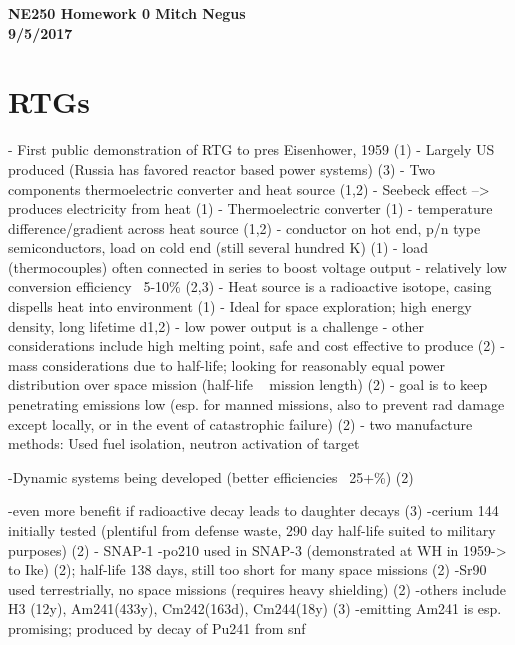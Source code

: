 \documentclass{report}
\begin{document}
\thispagestyle{empty}

{\bf {\large {NE250 Homework {0} \hfill Mitch Negus\\
		\hspace*{\fill} 9/5/2017\\ }}}
\section*{RTGs}


- First public demonstration of RTG to pres Eisenhower, 1959 (1)
- Largely US produced (Russia has favored reactor based power systems) (3)
- Two components thermoelectric converter and heat source (1,2)
- Seebeck effect --> produces electricity from heat (1)
- Thermoelectric converter (1)
	-  temperature difference/gradient across heat source (1,2)
	-  conductor on hot end, p/n type semiconductors, load on cold end (still several hundred K) (1)
	- load (thermocouples) often connected in series to boost voltage output
	- relatively low conversion efficiency ~5-10\% (2,3)
- Heat source is a radioactive isotope, casing dispells heat into environment (1)
- Ideal for space exploration; high energy density, long lifetime d1,2)
- low power output is a challenge
- other considerations include high melting point, safe and cost effective to produce (2)
- mass considerations due to half-life; looking for reasonably equal power distribution over space mission (half-life ~ mission length) (2)
- goal is to keep penetrating emissions low (esp. for manned missions, also to prevent rad damage except locally, or in the event of catastrophic failure) (2)
- two manufacture methods: Used fuel isolation, neutron activation of target

-Dynamic systems being developed (better efficiencies ~25+\%) (2)

-even more benefit if radioactive decay leads to daughter decays (3)
-cerium 144 initially tested (plentiful from defense waste, 290 day half-life suited to military purposes) (2) - SNAP-1
-po210 used in SNAP-3 (demonstrated at WH in 1959-> to Ike) (2); half-life 138 days, still too short for many space missions (2)
-Sr90 used terrestrially, no space missions (requires heavy shielding) (2)
-others include H3 (12y), Am241(433y), Cm242(163d), Cm244(18y) (3)
-\alpha emitting Am241 is esp. promising; produced by decay of Pu241 from snf
\end{document}
